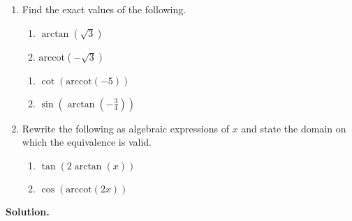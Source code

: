\begin{ex}  $~$

\begin{enumerate}

\item  Find the exact values of the following.

\begin{multicols}{2}

\begin{enumerate}

\item $\arctan(\sqrt{3})$
\item  $\mbox{arccot}(-\sqrt{3})$

\setcounter{HW}{\value{enumii}}

\end{enumerate}

\end{multicols}

\begin{multicols}{2}

\begin{enumerate}

\setcounter{enumii}{\value{HW}}

\item  $\cot(\mbox{arccot}(-5))$
\item  $\sin\left(\arctan\left(-\frac{3}{4}\right)\right)$

\end{enumerate}

\end{multicols}

\item  Rewrite the following as algebraic expressions of $x$ and state the domain on which the equivalence is valid.

\begin{multicols}{2}

\begin{enumerate}

\item  $\tan(2 \arctan(x))$

\item  $\cos(\mbox{arccot}(2x))$ 

\end{enumerate}

\end{multicols}

\end{enumerate}

{\bf Solution.}


\end{ex}
